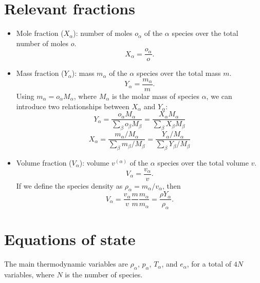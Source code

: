 \documentclass[oneside,a4paper,11pt]{report}
\begin{document}
\section{Relevant fractions}
\begin{itemize}
    \item Mole fraction ($X_\alpha$): number of moles $o_\alpha$ of the $\alpha$ species over the total number of moles $o$.
    \begin{equation}
        X_\alpha = \frac{o_\alpha}{o}.
    \end{equation}
    \item Mass fraction ($Y_\alpha$): mass $m_\alpha$ of the $\alpha$ species over the total mass $m$. 
    \begin{equation}
        Y_\alpha = \frac{m_\alpha}{m}.
    \end{equation}
    Using $m_\alpha = o_\alpha M_\alpha$, where $M_\alpha$ is the molar mass of species $\alpha$, we can introduce two relationships between $X_\alpha$ and $Y_\alpha$:
    \begin{equation}
    \label{eq:y_intermsof_x}
        Y_\alpha = \frac{o_\alpha M_\alpha}{\sum_\beta o_\beta M_\beta} = \frac{X_\alpha M_\alpha}{\sum_\beta X_\beta M_\beta}
    \end{equation}
    \begin{equation}
    \label{eq:x_intermsof_y}
        X_\alpha = \frac{m_\alpha / M_\alpha}{\sum_\beta m_\beta / M_\beta} = \frac{Y_\alpha / M_\alpha}{ \sum_\beta Y_\beta / M_\beta}
    \end{equation}
    \item Volume fraction ($V_\alpha$): volume $v^{(\alpha)}$ of the $\alpha$ species over the total volume $v$.
    \begin{equation}
        V_\alpha = \frac{v_\alpha}{v}.
    \end{equation}
    If we define the species density as $\rho_\alpha = m_\alpha/v_\alpha$, then
    \begin{equation}
    \label{eq:relation_volume_density_mass}
        V_\alpha = \frac{v_\alpha}{v} \frac{m}{m} \frac{m_\alpha}{m_\alpha} = \frac{\rho Y_\alpha}{\rho_\alpha}.
    \end{equation}
\end{itemize}

\section{Equations of state}
The main thermodynamic variables are $\rho_\alpha$, $p_\alpha$, $T_\alpha$, and $e_\alpha$, for a total of $4N$ variables, where $N$ is the number of species.
\end{document}

